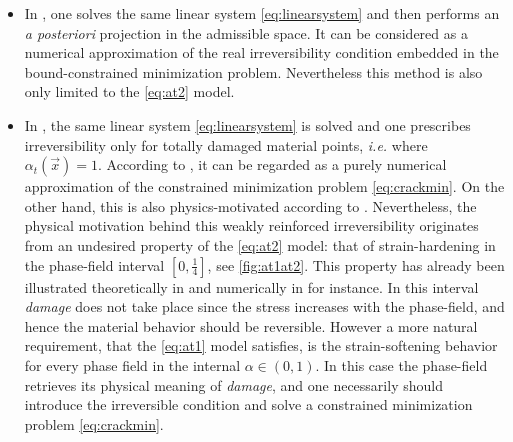 \begin{itemize}
\item In \cite{LancioniRoyer-Carfagni:2009}, one solves the same linear system \eqref{eq:linearsystem} and then performs an \emph{a posteriori} projection in the admissible space. It can be considered as a numerical approximation of the real irreversibility condition embedded in the bound-constrained minimization problem. Nevertheless this method is also only limited to the \eqref{eq:at2} model.

\item In \cite{BourdinFrancfortMarigo:2000,SchlueterWillenbuecherKuhnMueller:2014}, the same linear system \eqref{eq:linearsystem} is solved and one prescribes irreversibility only for totally damaged material points, \emph{i.e.} where $\alpha_t(\vec{x})=1$. According to \cite{AmorMarigoMaurini:2009}, it can be regarded as a purely numerical approximation of the constrained minimization problem \eqref{eq:crackmin}. On the other hand, this is also physics-motivated according to \cite{SchlueterWillenbuecherKuhnMueller:2014}. Nevertheless, the physical motivation behind this weakly reinforced irreversibility originates from an undesired property of the \eqref{eq:at2} model: that of strain-hardening in the phase-field interval $[0,\frac{1}{4}]$, see \cref{fig:at1at2}. This property has already been illustrated theoretically in \cite{PhamAmorMarigoMaurini:2011} and numerically in \cite{BordenVerhooselScottHughesLandis:2012} for instance. In this interval \emph{damage} does not take place since the stress increases with the phase-field, and hence the material behavior should be reversible. However a more natural requirement, that the \eqref{eq:at1} model satisfies, is the strain-softening behavior for every phase field in the internal $\alpha\in(0,1)$. In this case the phase-field retrieves its physical meaning of \emph{damage}, and one necessarily should introduce the irreversible condition and solve a constrained minimization problem \eqref{eq:crackmin}.
\end{itemize}

